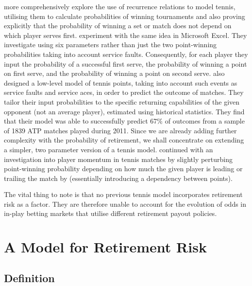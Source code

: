 \documentclass[letterpaper,12pt]{article}
\begin{document}
\cite{servefirst} more comprehensively explore the use of recurrence relations to model tennis, utilising them to calculate probabilities of winning tournaments and also proving explicitly that the probability of winning a set or match does not depend on which player serves first.  \cite{excel} experiment with the same idea in Microsoft Excel.  They investigate using six parameters rather than just the two point-winning probabilities taking into account service faults.  Consequently, for each player they input the probability of a successful first serve, the probability of winning a point on first serve, and the probability of winning a point on second serve.  \cite{willyk} also designed a low-level model of tennis points, taking into account such events as service faults and service aces, in order to predict the outcome of matches.  They tailor their input probabilities to the specific returning capabilities of the given opponent (not an average player), estimated using historical statistics.  They find that their model was able to successfully predict 67\% of outcomes from a sample of 1839 ATP matches played during 2011.  Since we are already adding further complexity with the probability of retirement, we shall concentrate on extending a simpler, two parameter version of a tennis model.  \cite{momentum} continued with an investigation into player momentum in tennis matches by slightly perturbing point-winning probability depending on how much the given player is leading or trailing the match by (essentially introducing a dependency between points).

The vital thing to note is that no previous tennis model incorporates retirement risk as a factor.  They are therefore unable to account for the evolution of odds in in-play betting markets that utilise different retirement payout policies.

\newpage

\section{A Model for Retirement Risk}

\subsection{Definition}
\end{document}
